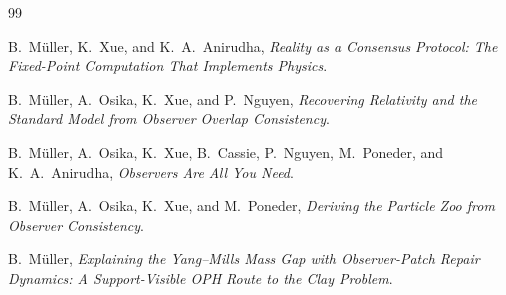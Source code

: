 \documentclass[11pt]{article}
\theoremstyle{remark}
\theoremstyle{plain}
\begin{document}
\begin{thebibliography}{99}

B.\ M\"uller, K.\ Xue, and K.\ A.\ Anirudha,
\emph{Reality as a Consensus Protocol: The Fixed-Point Computation That Implements Physics}.

B.\ M\"uller, A.\ Osika, K.\ Xue, and P.\ Nguyen,
\emph{Recovering Relativity and the Standard Model from Observer Overlap Consistency}.

B.\ M\"uller, A.\ Osika, K.\ Xue, B.\ Cassie, P.\ Nguyen, M.\ Poneder, and K.\ A.\ Anirudha,
\emph{Observers Are All You Need}.

B.\ M\"uller, A.\ Osika, K.\ Xue, and M.\ Poneder,
\emph{Deriving the Particle Zoo from Observer Consistency}.

B.\ M\"uller,
\emph{Explaining the Yang--Mills Mass Gap with Observer-Patch Repair Dynamics: A Support-Visible OPH Route to the Clay Problem}.

\end{thebibliography}
\end{document}
